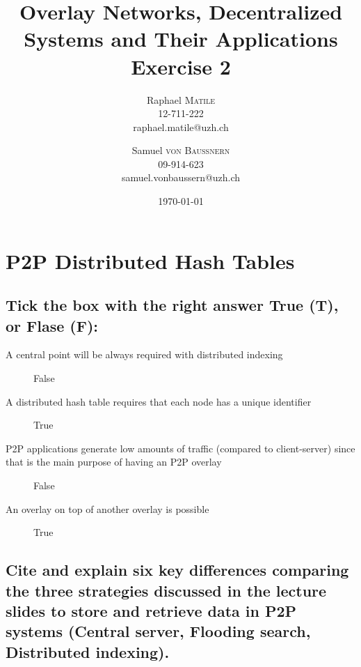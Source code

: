 \documentclass{article}
\title{Overlay Networks, Decentralized Systems and Their Applications
\\Exercise 2}
\author{Raphael \textsc{Matile}\\12-711-222\\raphael.matile@uzh.ch
\and Samuel \textsc{von Baussnern}\\09-914-623\\samuel.vonbaussern@uzh.ch}
\date{\today} %
\begin{document}
\maketitle %

\section{P2P Distributed Hash Tables}

\subsection{Tick the box with the right answer True (T), or Flase (F):}

\begin{description}
  \item[A central point will be always required with distributed indexing]

    False

  \item[A distributed hash table requires that each node has a unique identifier]

    True

  \item[P2P applications generate low amounts of traffic (compared to client-server)
         since that is the main purpose of having an P2P overlay]

    False

  \item[An overlay on top of another overlay is possible]

    True

\end{description}

\subsection{Cite and explain six key differences comparing the three strategies
discussed in the lecture slides to store and retrieve data in P2P systems
(Central server, Flooding search, Distributed indexing).}
\end{document}

